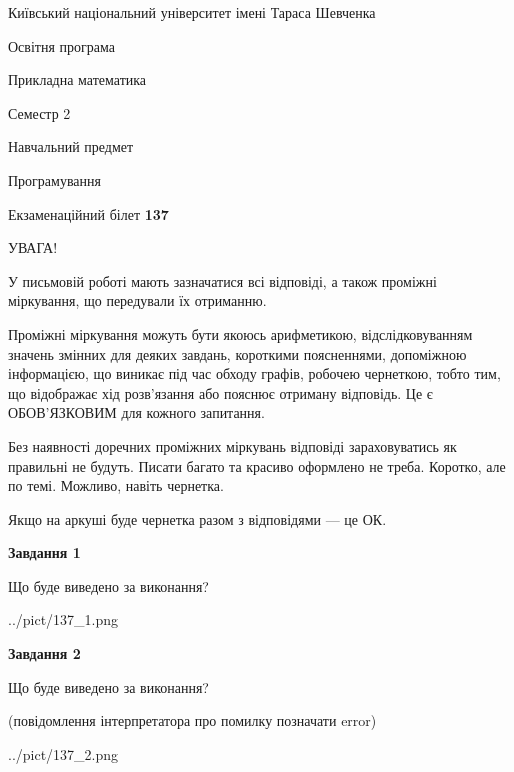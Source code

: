 \documentclass[12pt, ukrainian]{article}
\begin{document}
{{\begin {small}\par
{ \center  Київський національний університет імені Тараса Шевченка \par}
{\parbox {5 cm}{Освітня програма \hfill}{\parbox {7 cm}{Прикладна математика\hfill}}\parbox {6 cm}{\hfill Семестр 2}}\par
{\parbox {5 cm} {Навчальний предмет \hfill}\parbox {7 cm}{Програмування \hfill}\parbox {6cm}{\hfill}\par}\vspace{-7pt} \end{small}}{\center Екзаменаційний білет \No \textbf
{ 137 }\par}}
{
\begin {large}
УВАГА!

У письмовій роботі мають зазначатися всі відповіді, а також проміжні міркування, що передували їх отриманню.

Проміжні міркування можуть бути якоюсь арифметикою, відслідковуванням зна\-чень змінних для деяких завдань,
короткими поясненнями, допоміжною інформацією, що виникає під час обходу графів, робочею чернеткою,
тобто тим, що відображає хід розв’язання або пояснює отриману відповідь.
Це є ОБОВ’ЯЗКОВИМ для кожного запитання.

Без наявності доречних проміжних міркувань відповіді зараховуватись як правиль\-ні не будуть.
Писати багато та красиво оформлено не треба. Коротко, але по темі. Можли\-во, навіть чернетка.

Якщо на аркуші буде чернетка разом з відповідями --- це ОК.

\newpage

{\begin {center}\textbf{Завдання 1}\end {center}}\par
Що буде виведено за виконання?\par
\begin{center}
	{../pict/137_1.png}
\end{center}
\newpage

{\begin {center}\textbf{Завдання 2}\end {center}}\par
Що буде виведено за виконання?\par
 (повідомлення інтерпретатора про помилку позначати error)\par
\begin{center}
	{../pict/137_2.png}
\end{center}
\newpage


\end{large}}
\end{document}
